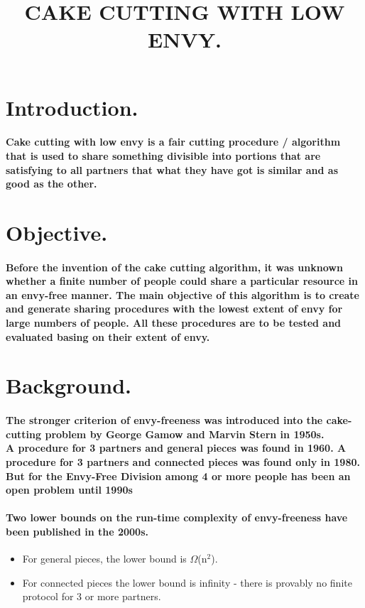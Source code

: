 \documentclass[12pt]{report}
\title{\textbf{CAKE CUTTING WITH LOW ENVY.}}
\author{}
\begin{document}
\maketitle

	\section{Introduction.} 
	\paragraph{Cake cutting with low envy is a fair cutting procedure / algorithm that is used to share something divisible into portions that are satisfying to all partners that what they have got is similar and as good as the other. }
	
		\section{Objective.}
		\paragraph{Before the invention of the cake cutting algorithm, it was unknown whether a finite number of people could share a particular resource in an envy-free manner. The main objective of this algorithm is to create and generate sharing procedures with the lowest extent of envy for large numbers of people. All these procedures are to be tested and evaluated basing on their extent of envy.  }
		
	\section{Background.}
	\paragraph{The stronger criterion of envy-freeness was introduced into the cake-cutting problem by George Gamow and Marvin Stern in 1950s.\\
		A procedure for 3 partners and general pieces was found in 1960. A procedure for 3 partners and connected pieces was found only in 1980.\\
		But for the Envy-Free Division among 4 or more people has been an open problem until 1990s}
	\paragraph{Two lower bounds on the run-time complexity of envy-freeness have been published in the 2000s.}
	\begin{itemize}
		\item For general pieces, the lower bound is $\Omega$(n$^{2}$).
		\item For connected pieces the lower bound is infinity - there is provably no finite protocol for 3 or more partners.
	\end{itemize}
\end{document}
